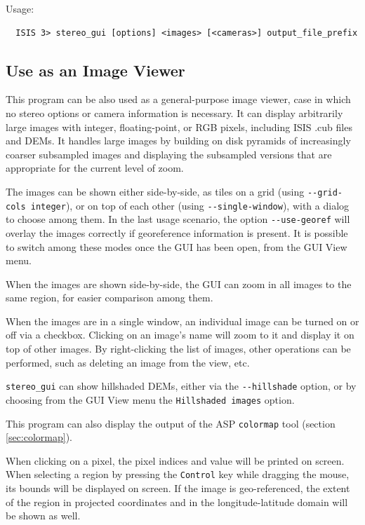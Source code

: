 Usage:
\begin{verbatim}
  ISIS 3> stereo_gui [options] <images> [<cameras>] output_file_prefix
\end{verbatim}

\subsection{Use as an Image Viewer}

This program can be also used as a general-purpose image viewer, case in
which no stereo options or camera information is necessary.  It can
display arbitrarily large images with integer, floating-point, or RGB
pixels, including ISIS .cub files and DEMs. It handles large images by
building on disk pyramids of increasingly coarser subsampled images and
displaying the subsampled versions that are appropriate for the current
level of zoom.

The images can be shown either side-by-side, as tiles on a grid (using
\texttt{-\/-grid-cols integer}), or on top of each other (using
\texttt{-\/-single-window}), with a dialog to choose among them.  In the
last usage scenario, the option \texttt{-\/-use-georef} will overlay the
images correctly if georeference information is present.  It is possible
to switch among these modes once the GUI has been open, from the GUI
View menu.

When the images are shown side-by-side, the GUI can zoom
in all images to the same region, for easier comparison among them.

When the images are in a single window, an individual image can be turned
on or off via a checkbox. Clicking on an image's name will zoom to it
and display it on top of other images. By right-clicking the list
of images, other operations can be performed, such as deleting an image
from the view, etc. 

\texttt{stereo\_gui} can show hillshaded DEMs, either via the
\texttt{-\/-hillshade} option, or by choosing from the GUI View menu the
\texttt{Hillshaded images} option.

This program can also display the output of the ASP \texttt{colormap}
tool (section \ref{sec:colormap}).

When clicking on a pixel, the pixel indices and value will be printed on screen.
When selecting a region by pressing the \texttt{Control} key while dragging the mouse, 
its bounds will be displayed on screen. If the image is geo-referenced,
the extent of the region in projected coordinates and in the longitude-latitude domain 
will be shown as well. 


